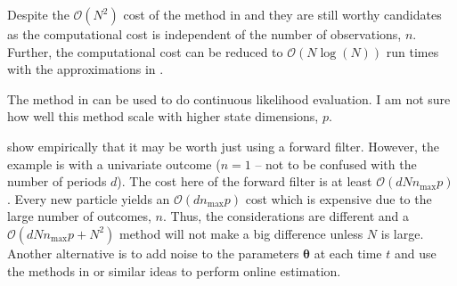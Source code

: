 \documentclass[notitlepage]{article}
\renewcommand{\vec}[1]{\bm{#1}}
\newcommand{\Lparen}[1]{\left( #1\right)}
\newcommand{\bigO}[1]{\mathcal{O}\Lparen{#1}}
\newcommand{\dimState}{p}
\newcommand{\nPart}{N}
\newcommand{\nPeriods}{d}
\newcommand{\nMax}{n_{\text{max}}}
\begin{document}
Despite the $\bigO{\nPart^2}$ cost of the method in \citet{briers09} and \cite{del10} they are still worthy candidates as the computational cost is independent of the number of observations, $n$.  Further, the computational cost can be reduced to 
$\bigO{\nPart\log(\nPart)}$ run times 
with the approximations in \cite{klaas06}.

The method in \citet[see particularly section 6.2 on page 203]{malik11} can be used to do continuous likelihood evaluation. I am not sure how well this method scale with higher state dimensions, $\dimState$.

\citet{kantas15} show empirically that it may be worth just using a forward filter. However, the example is with a univariate outcome ($n=1$ -- not to be confused with the number of periods $\nPeriods$). The cost here of the forward filter is at least $\bigO{\nPeriods\nPart\nMax\dimState}$. Every new particle yields an $\bigO{\nPeriods\nMax\dimState}$ cost which is expensive due to the large number of outcomes, $n$. Thus, the considerations are different and a $\bigO{\nPeriods\nPart\nMax\dimState + \nPart^2}$ method will not make a big difference unless $\nPart$ is large. Another alternative is to add noise to the parameters $\vec{\theta}$ at each time $t$ and use the methods in \cite{andrieu02} or similar ideas to perform online estimation.
\end{document}
